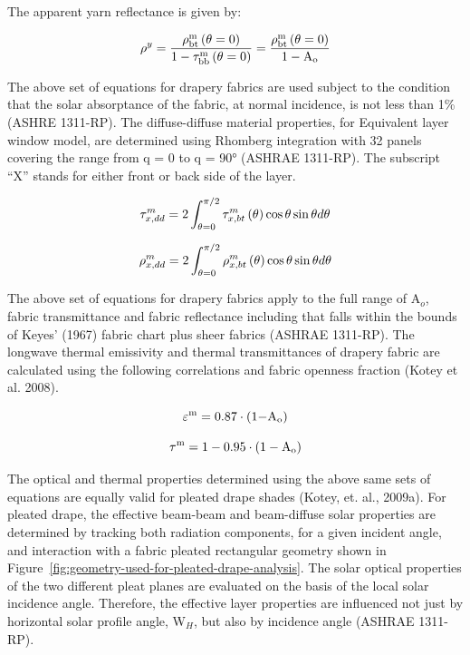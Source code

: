 The apparent yarn reflectance is given by:

\begin{equation}
{\rho ^y} = \frac{{\rho_{{\rm{bt}}}^{\rm{m}}\left( {{\rm{\theta }} = {\rm{0}}} \right)}}{{{\rm{1}} - \tau_{{\rm{bb}}}^{\rm{m}}\left( {{\rm{\theta }} = {\rm{0}}} \right)}} = \frac{{\rho_{{\rm{bt}}}^{\rm{m}}\left( {{\rm{\theta }} = {\rm{0}}} \right)}}{{{\rm{1}} - {{\rm{A}}_{\rm{o}}}}}
\end{equation}

The above set of equations for drapery fabrics are used subject to the condition that the solar absorptance of the fabric, at normal incidence, is not less than 1\% (ASHRE 1311-RP). The diffuse-diffuse material properties, for Equivalent layer window model, are determined using Rhomberg integration with 32 panels covering the range from q = 0 to q = 90° (ASHRAE 1311-RP). The subscript ``X'' stands for either front or back side of the layer.

\begin{equation}
  \tau_{x,dd}^{m} = 2\int_{\theta=0}^{\pi/2}\tau_{x,bt}^{m}\left(\theta\right)\cos\theta\sin\theta d\theta
\end{equation}

\begin{equation}
  \rho_{x,dd}^{m} = 2\int_{\theta=0}^{\pi/2}\rho_{x,bt}^{m}\left(\theta\right)\cos\theta\sin\theta d\theta
\end{equation}

The above set of equations for drapery fabrics apply to the full range of A\(_{o}\), fabric transmittance and fabric reflectance including that falls within the bounds of Keyes' (1967) fabric chart plus sheer fabrics (ASHRAE 1311-RP). The longwave thermal emissivity and thermal transmittances of drapery fabric are calculated using the following correlations and fabric openness fraction (Kotey et al. 2008).

\begin{equation}
{\varepsilon ^{\rm{m}}} = {\rm{0}}{\rm{.87}} \cdot \left( {{\rm{1 - }}{{\rm{A}}_{\rm{o}}}} \right)
\end{equation}

\begin{equation}
{\tau ^{\rm{m}}} = {\rm{1}} - {\rm{0}}{\rm{.95}} \cdot \left( {{\rm{1}} - {{\rm{A}}_{\rm{o}}}} \right)
\end{equation}

The optical and thermal properties determined using the above same sets of equations are equally valid for pleated drape shades (Kotey, et. al., 2009a). For pleated drape, the effective beam-beam and beam-diffuse solar properties are determined by tracking both radiation components, for a given incident angle, and interaction with a fabric pleated rectangular geometry shown in Figure~\ref{fig:geometry-used-for-pleated-drape-analysis}. The solar optical properties of the two different pleat planes are evaluated on the basis of the local solar incidence angle. Therefore, the effective layer properties are influenced not just by horizontal solar profile angle, W\(_{H}\), but also by incidence angle (ASHRAE 1311-RP).

